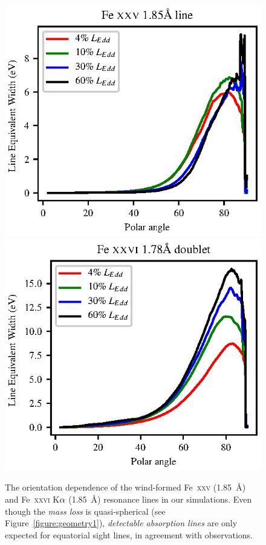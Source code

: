 \documentclass[a4paper,fleqn,usenatbib]{mnras}
\begin{document}
\begin{figure}
\includegraphics[width=\columnwidth]{figures/fig3_fe25EW.eps}
\includegraphics[width=\columnwidth]{figures/fig3_fe26EW.eps}
\caption{The orientation dependence of the wind-formed Fe~\textsc{xxv} 
(1.85~{\AA}) and Fe~\textsc{xxvi} K$\rm{\alpha}$ (1.85~{\AA}) resonance
 lines in our simulations. Even though the {\em mass loss} is quasi-spherical
  (see Figure~\ref{figure:geometry1}), {\em detectable absorption lines} 
  are only expected for equatorial sight lines, in agreement with observations.}
\label{figure:geometry2}
\end{figure}
\end{document}
